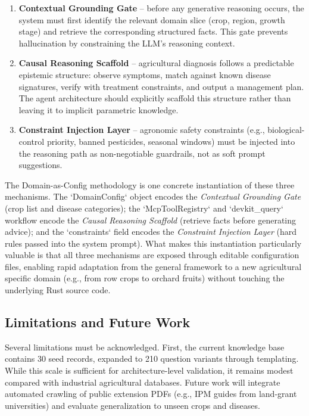 \documentclass[11pt,a4paper]{article}
\begin{document}
\begin{enumerate}[label=\textbf{M\arabic*:},leftmargin=*]
    \item \textbf{Contextual Grounding Gate} -- before any generative reasoning occurs, the system must first identify the relevant domain slice (crop, region, growth stage) and retrieve the corresponding structured facts. This gate prevents hallucination by constraining the LLM's reasoning context.
    \item \textbf{Causal Reasoning Scaffold} -- agricultural diagnosis follows a predictable epistemic structure: observe symptoms, match against known disease signatures, verify with treatment constraints, and output a management plan. The agent architecture should explicitly scaffold this structure rather than leaving it to implicit parametric knowledge.
    \item \textbf{Constraint Injection Layer} -- agronomic safety constraints (e.g., biological-control priority, banned pesticides, seasonal windows) must be injected into the reasoning path as non-negotiable guardrails, not as soft prompt suggestions.
\end{enumerate}

The Domain-as-Config methodology is one concrete instantiation of these three mechanisms. The `DomainConfig` object encodes the \textit{Contextual Grounding Gate} (crop list and disease categories); the `McpToolRegistry` and `devkit_query` workflow encode the \textit{Causal Reasoning Scaffold} (retrieve facts before generating advice); and the `constraints` field encodes the \textit{Constraint Injection Layer} (hard rules passed into the system prompt). What makes this instantiation particularly valuable is that all three mechanisms are exposed through editable configuration files, enabling rapid adaptation from the general framework to a new agricultural specific domain (e.g., from row crops to orchard fruits) without touching the underlying Rust source code.

\subsection{Limitations and Future Work}

Several limitations must be acknowledged. First, the current knowledge base contains 30 seed records, expanded to 210 question variants through templating. While this scale is sufficient for architecture-level validation, it remains modest compared with industrial agricultural databases. Future work will integrate automated crawling of public extension PDFs (e.g., IPM guides from land-grant universities) and evaluate generalization to unseen crops and diseases.
\end{document}
